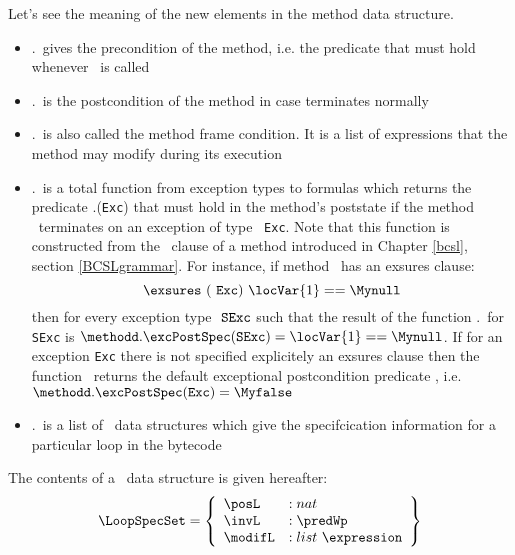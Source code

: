 Let's see the meaning of the new elements in the method data structure.
\begin{itemize}
     \item \methodd.\pre \ gives the precondition of the method, i.e. the predicate that must hold
           whenever \methodd \  is called
     \item \methodd.\normalPost \ is the postcondition of the method in case \methodd terminates normally  
     
     \item \methodd.\modif \ is also called the method frame condition. It is a list of expressions that the method
            may modify during its execution    
     
     \item \methodd.\excPostSpec \ is a total function from exception types to formulas which returns the predicate
           \methodd.\excPostSpec(\texttt{Exc})  that must hold in the method's poststate 
	   if the method \methodd \ terminates on an exception of type \mbox{ \rm \texttt{Exc}}. 
	   Note that this function is constructed from the \exsures \ clause of a method introduced in  Chapter \ref{bcsl},
	   section \ref{BCSLgrammar}. For instance, if method \methodd \ has an exsures clause:
	   $$ \exsures \  ( \mbox{ \rm \texttt{Exc}}) \ \locVar{1} == \Mynull $$
	   then for every exception type $\mbox{ \rm \texttt{SExc}} $ such that 
	    the result of the function \methodd.\excPostSpec \  for  \texttt{SExc} 
           is $\methodd.\excPostSpec(\texttt{SExc} ) = \locVar{1} == \Mynull$. If for an exception \texttt{Exc} there is not specified
	   explicitely an exsures clause then the function \excPostSpec \ returns the default exceptional postcondition predicate \Myfalse, i.e.
	   $\methodd.\excPostSpec(\texttt{Exc} ) = \Myfalse$
     \item \methodd.\loopSpecTable \ is a list of \LoopSpecSet \ data structures which give the specifcication information 
           for a particular loop in the bytecode         
\end{itemize}

 
The contents of a \LoopSpecSet \ data structure is given hereafter:
$$ \begin{array}{l}
      \LoopSpecSet = \left\{\begin{array}{ll}  
                                       \posL   & : nat \\
                                       \invL   & : \predWp \\                 
	                               \modifL   & :  list \ \expression  
                            \end{array}  \right\} 
     \end{array} $$ 


